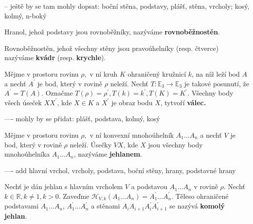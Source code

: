\begin{pozn}
    -- ještě by se tam mohly dopsat: boční stěna, podstavy, plášť, stěna, vrcholy; kosý,
    kolmý, n-boký
\end{pozn}

\begin{definition}
    Hranol, jehož podstavy jsou rovnoběžníky, nazýváme \textbf{rovnoběžnostěn}.
\end{definition}

\begin{definition}
    Rovnoběžnostěn, jehož všechny stěny jsou pravoúhelníky (resp. čtverce) nazýváme
    \textbf{kvádr} (resp. \textbf{krychle}).
\end{definition}

\begin{definition}
    Mějme v prostoru rovinu $\rho,$ v ní kruh $K$ ohraničený kružnicí $k$, na níž
    leží bod $A$ a nechť
    $A^\prime$ je bod, který v rovině $\rho$ neleží. Nechť $T: \mathbb E_3 \to
    \mathbb E_3$ je takové posunutí, že $A^\prime=T(A).$ Označme $T(\rho)=\rho^\prime,
    T(k)=k^\prime, T(K)=K^\prime.$ Všechny body všech úseček $XX^\prime$, kde $X\in K$
    a $X^\prime$ je obraz bodu $X$, tytvoří \textbf{válec.}
\end{definition}

\begin{pozn}
    ---- mohly by se přidat: plášť, podstava, kolmý, kosý
\end{pozn}

\begin{definition}
Mějme v prostoru rovinu $\rho,$ v ní konvexní mnohoúhelník $A_1\dots A_n$ a nechť
$V$ je bod, který v rovině $\rho$ neleží. Úsečky $VX$, kde $X$ jsou všechny body
mnohoúhelníka $A_1\dots A_n$, nazýváme \textbf{jehlanem}.
\end{definition}

\begin{pozn}
    ---- add hlavní vrchol, vrcholy, podstava, boční stěny, hrany, podstavné hrany
\end{pozn}

\begin{definition}
    Nechť je dán jehlan s hlavním vrcholem $V$ a podstavou $A_1\dots A_n$ v rovině
    $\rho.$ Nechť $k \in \mathbb R, k \ne 1, k >0.$ Zaveďme $\mathscr H_{V,k}(A_1\dots A_n)
    =A_1^\prime\dots A_n^\prime.$ Těleso ohraničené podstavami $A_1\dots A_n$,
    $A_1^\prime\dots A_n^\prime$ a stěnami $A_iA_{i+1}A_i^\prime A_{i+1}^\prime$ se
    nazývá \textbf{komolý jehlan}.
\end{definition}


